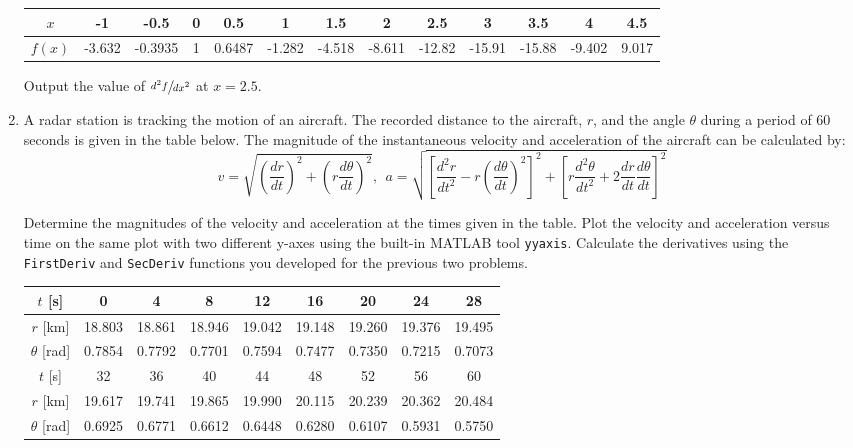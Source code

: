 \begin{fullwidth}
\begin{enumerate}
\begin{table}[h!]
\centering
\begin{tabular}{|c|c|c|c|c|c|c|c|c|c|c|c|c|}
\hline
$x$ & -1 & -0.5 & 0 & 0.5 & 1 & 1.5 & 2 & 2.5 & 3 & 3.5 & 4 & 4.5 \\ \hline
$f(x)$ & -3.632 & -0.3935 & 1 & 0.6487 & -1.282 & -4.518 & -8.611 & -12.82 & -15.91 & -15.88 & -9.402 & 9.017 \\ \hline
\end{tabular}
\end{table}
Output the value of $\sfrac{d^2f}{dx^2}$ at $x=2.5$.

\pagebreak

\item A radar station is tracking the motion of an aircraft.  The recorded distance to the aircraft, $r$, and the angle $\theta$ during a period of 60 seconds is given in the table below.  The magnitude of the instantaneous velocity and acceleration of the aircraft can be calculated by:
\begin{equation*}
v = \sqrt{\left(\frac{dr}{dt} \right)^2 + \left(r \frac{d \theta}{dt} \right)^2}, \ \ a = \sqrt{\left[\frac{d^2r}{dt^2} - r\left(\frac{d\theta}{dt} \right)^2 \right]^2 + \left[r \frac{d^2\theta}{dt^2} + 2 \frac{dr}{dt}\frac{d\theta}{dt} \right]^2}
\end{equation*}

Determine the magnitudes of the velocity and acceleration at the times given in the table.  Plot the velocity and acceleration versus time on the same plot with two different y-axes using the built-in MATLAB tool \lstinline[style=myMatlab]{yyaxis}. Calculate the derivatives using the \lstinline[style=myMatlab]{FirstDeriv} and \lstinline[style=myMatlab]{SecDeriv} functions you developed for the previous two problems.

\begin{table}[h!]
\centering
\begin{tabular}{|c|c|c|c|c|c|c|c|c|}
\hline
$t$ [s] & 0 & 4 & 8 & 12 & 16 & 20 & 24 & 28 \\ \hline
$r$ [km] & 18.803 & 18.861 & 18.946 & 19.042 & 19.148 & 19.260 & 19.376 & 19.495 \\ \hline
$\theta$ [rad] & 0.7854 & 0.7792 & 0.7701 & 0.7594 & 0.7477 & 0.7350 & 0.7215 & 0.7073 \\ \hline
$t$ [s] & 32 & 36 & 40 & 44 & 48 & 52 & 56 & 60 \\ \hline
$r$ [km] & 19.617 & 19.741 & 19.865 & 19.990 & 20.115 & 20.239 & 20.362 & 20.484 \\ \hline
$\theta$ [rad] & 0.6925 & 0.6771 & 0.6612 & 0.6448 & 0.6280 & 0.6107 & 0.5931 &0.5750 \\ \hline
\end{tabular}
\end{table}

\vspace{2.0cm}
\end{enumerate}
\end{fullwidth}

